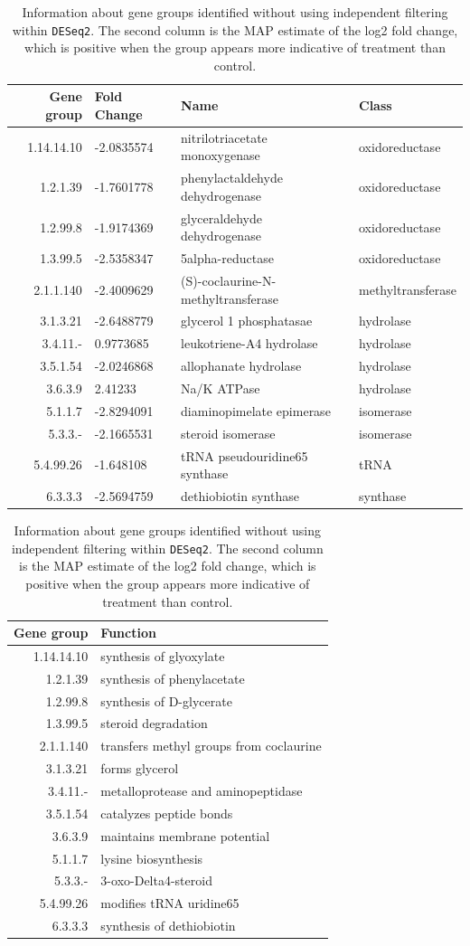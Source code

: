 \documentclass{article}
\begin{document}
\begin{table}[!h]
\begin{center}
\begin{tabular}{r|lll}
Gene group & Fold Change&Name & Class \\
\hline
1.14.14.10 & -2.0835574&nitrilotriacetate monoxygenase & oxidoreductase \\
1.2.1.39 & -1.7601778&phenylactaldehyde dehydrogenase & oxidoreductase \\
1.2.99.8 & -1.9174369&glyceraldehyde dehydrogenase & oxidoreductase \\
1.3.99.5 & -2.5358347&5alpha-reductase & oxidoreductase \\
2.1.1.140 & -2.4009629&(S)-coclaurine-N-methyltransferase & methyltransferase \\
3.1.3.21 &-2.6488779& glycerol 1 phosphatasae & hydrolase \\
3.4.11.- & 0.9773685&leukotriene-A4 hydrolase & hydrolase \\
3.5.1.54 & -2.0246868&allophanate hydrolase & hydrolase \\
3.6.3.9 &2.41233& Na/K ATPase & hydrolase \\
5.1.1.7 & -2.8294091&diaminopimelate epimerase & isomerase \\
5.3.3.- &-2.1665531& steroid isomerase & isomerase \\
5.4.99.26 & -1.648108&tRNA pseudouridine65 synthase & tRNA \\
6.3.3.3 & -2.5694759&dethiobiotin synthase & synthase 
\end{tabular}

\begin{tabular}{r|l}
Gene group & Function \\
\hline
1.14.14.10 &  synthesis of glyoxylate\\
1.2.1.39 &  synthesis of phenylacetate\\
1.2.99.8 &  synthesis of D-glycerate\\
1.3.99.5 &  steroid degradation\\
2.1.1.140 &  transfers methyl groups from coclaurine\\
3.1.3.21 & forms glycerol\\
3.4.11.- &  metalloprotease and aminopeptidase\\
3.5.1.54 &  catalyzes peptide bonds\\
3.6.3.9 & maintains membrane potential\\
5.1.1.7 &  lysine biosynthesis\\
5.3.3.- & 3-oxo-Delta4-steroid\\
5.4.99.26 &  modifies tRNA uridine65\\
6.3.3.3 &  synthesis of dethiobiotin
\end{tabular}
\caption{\label{tbl:groups-info}Information about gene groups identified without using independent filtering within \texttt{DESeq2}. The second column is the MAP estimate of the log2 fold change, which is positive when the group appears more indicative of treatment than control.}
\end{center}
\end{table}
\end{document}
